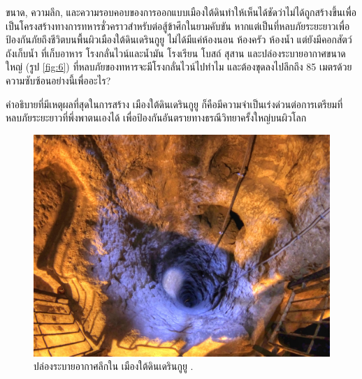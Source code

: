 \documentclass[10pt,twocolumn,letterpaper]{article}
\begin{document}
ขนาด, ความลึก, และความรอบคอบของการออกแบบเมืองใต้ดินทำให้เห็นได้ชัดว่าไม่ได้ถูกสร้างขึ้นเพื่อเป็นโครงสร้างทางการทหารชั่วคราวสำหรับต่อสู้ข้าศึกในยามคับขัน หากแต่เป็นที่หลบภัยระยะยาวเพื่อป้องกันภัยถึงชีวิตบนพื้นผิวเมืองใต้ดินเดรินกูยู ไม่ได้มีแค่ห้องนอน ห้องครัว ห้องน้ำ แต่ยังมีคอกสัตว์ ถังเก็บน้ำ ที่เก็บอาหาร โรงกลั่นไวน์และน้ำมัน โรงเรียน โบสถ์ สุสาน และปล่องระบายอากาศขนาดใหญ่ (รูป \ref{fig:6}) ที่หลบภัยของทหารจะมีโรงกลั่นไวน์ไปทำไม และต้องขุดลงไปลึกถึง 85 เมตรด้วยความซับซ้อนอย่างนี้เพื่ออะไร?

คำอธิบายที่มีเหตุผลที่สุดในการสร้าง เมืองใต้ดินเดรินกูยู ก็คือมีความจำเป็นเร่งด่วนต่อการเตรียมที่หลบภัยระยะยาวที่พึ่งพาตนเองได้ เพื่อป้องกันอันตรายทางธรณีวิทยาครั้งใหญ่บนผิวโลก

\begin{figure}[t]
\begin{center}
   \includegraphics[width=1\linewidth]{derinkuyu-air.jpg}
\end{center}
   \caption{ปล่องระบายอากาศลึกใน เมืองใต้ดินเดรินกูยู \cite{53}.}
\label{fig:6}
\label{fig:onecol}
\end{figure}


\end{document}
